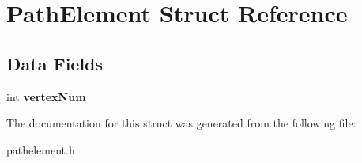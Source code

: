 \hypertarget{structPathElement}{}\section{Path\+Element Struct Reference}
\label{structPathElement}
\subsection*{Data Fields}
\begin{DoxyCompactItemize}
\item 
int {\bfseries vertex\+Num}\hypertarget{structPathElement_a1f2bbaf04337046497c6ac63d96062a7}{}\label{structPathElement_a1f2bbaf04337046497c6ac63d96062a7}

\end{DoxyCompactItemize}


The documentation for this struct was generated from the following file\+:\begin{DoxyCompactItemize}
\item 
pathelement.\+h\end{DoxyCompactItemize}
